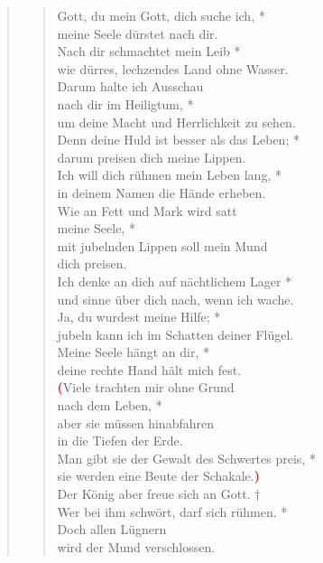 \begin{quote}
\begin{verse}
Gott, du mein Gott, dich suche ich, *\\ 
meine Seele dürstet nach dir.\\ 
\vin Nach dir schmachtet mein Leib *\\ 
\vin wie dürres, lechzendes Land ohne Wasser.\\  
Darum halte ich Ausschau\\
nach dir im Heiligtum, *\\ 
um deine Macht und Herrlichkeit zu sehen.\\ 
\vin Denn deine Huld ist besser als das Leben; *\\ 
\vin darum preisen dich meine Lippen.\\ 
Ich will dich rühmen mein Leben lang, *\\ 
in deinem Namen die Hände erheben.\\ 
\vin Wie an Fett und Mark wird satt \\ 
\vin meine Seele, *\\ 
\vin mit jubelnden Lippen soll mein Mund \\ 
\vin dich preisen.\\  
Ich denke an dich auf nächtlichem Lager *\\ 
und sinne über dich nach, wenn ich wache.\\ 
\vin Ja, du wurdest meine Hilfe; *\\ 
\vin jubeln kann ich im Schatten deiner Flügel.\\  
Meine Seele hängt an dir, *\\ 
deine rechte Hand hält mich fest.\\ 
\vin \textcolor{red}{\bf{(}}Viele trachten mir ohne Grund\\ 
\vin nach dem Leben, *\\ 
\vin aber sie müssen hinabfahren\\ 
\vin in die Tiefen der Erde.\\ 
Man gibt sie der Gewalt des Schwertes preis, *\\ 
sie werden eine Beute der Schakale.\textcolor{red}{\bf{)}}\\ \vin 
Der König aber freue sich an Gott. †\\ 
\vin Wer bei ihm schwört, darf sich rühmen. *\\ 
\vin  Doch allen Lügnern\\
\vin wird der Mund verschlossen.\\  

\end{verse}
\end{quote}


